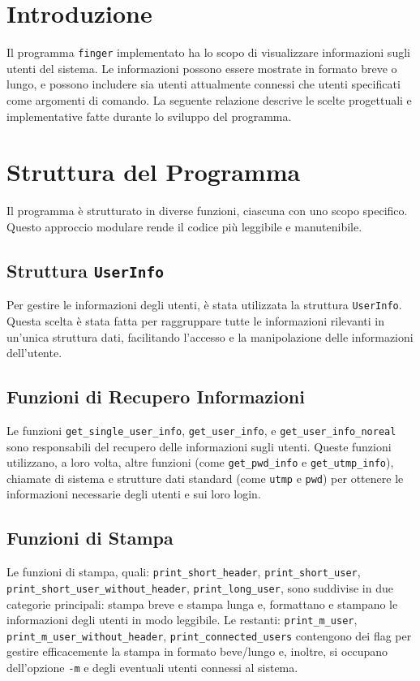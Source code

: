 \section{Introduzione}

Il programma \texttt{finger} implementato ha lo scopo di visualizzare informazioni sugli utenti del sistema. Le informazioni possono essere mostrate in formato breve o lungo, e possono includere sia utenti attualmente connessi che utenti specificati come argomenti di comando. La seguente relazione descrive le scelte progettuali e implementative fatte durante lo sviluppo del programma.

\section{Struttura del Programma}

Il programma è strutturato in diverse funzioni, ciascuna con uno scopo specifico. Questo approccio modulare rende il codice più leggibile e manutenibile.

\subsection{Struttura \texttt{UserInfo}}

Per gestire le informazioni degli utenti, è stata utilizzata la struttura \texttt{UserInfo}. Questa scelta è stata fatta per raggruppare tutte le informazioni rilevanti in un'unica struttura dati, facilitando l'accesso e la manipolazione delle informazioni dell'utente.

\subsection{Funzioni di Recupero Informazioni}

Le funzioni \texttt{get\_single\_user\_info}, \texttt{get\_user\_info}, e \texttt{get\_user\_info\_noreal} sono responsabili del recupero delle informazioni sugli utenti. Queste funzioni utilizzano, a loro volta, altre funzioni (come \texttt{get\_pwd\_info} e \texttt{get\_utmp\_info}), chiamate di sistema e strutture dati standard (come \texttt{utmp} e \texttt{pwd}) per ottenere le informazioni necessarie degli utenti e sui loro login.

\subsection{Funzioni di Stampa}

Le funzioni di stampa, quali: \texttt{print\_short\_header}, \texttt{print\_short\_user}, \\\texttt{print\_short\_user\_without\_header}, \texttt{print\_long\_user}, sono suddivise in due categorie principali: stampa breve e stampa lunga e, formattano e stampano le informazioni degli utenti in modo leggibile. Le restanti: \texttt{print\_m\_user}, \texttt{print\_m\_user\_without\_header}, \texttt{print\_connected\_users} contengono dei flag per gestire efficacemente la stampa in formato beve/lungo e, inoltre, si occupano dell'opzione \texttt{-m} e degli eventuali utenti connessi al sistema. 

